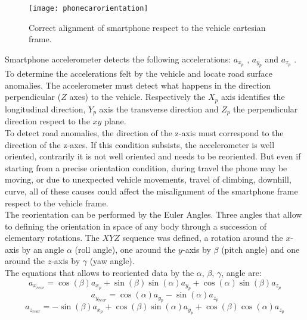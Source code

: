 \documentclass[tesi]{subfiles}
\begin{document}
\begin{figure}[H]
  \centering
  \texttt{[image: phonecarorientation]}  
  \caption{Correct alignment of smartphone respect to the vehicle cartesian frame.}
  \label{fig:Smartphone cartesian frame alignment respect Car axis.}
\end{figure}
\noindent Smartphone accelerometer detects the following accelerations: $a_{x_{p}}$ , $a_{y_{p}}$ and $a_{z_{p}}$ . To determine the accelerations felt by the vehicle and locate road surface anomalies. The accelerometer must detect what happens in the direction perpendicular ($Z$ axes) to the vehicle\cite{mohan2008nericell}.
Respectively the $X_{p}$ axis identifies the longitudinal direction, $Y_{p}$ axis the transverse direction and $Z_{p}$ the perpendicular direction respect to the $xy$ plane.\\

\noindent To detect road anomalies, the direction of the z-axis must correspond to the direction of the z-axes. If this condition subsists, the accelerometer is well oriented, contrarily it is not well oriented and needs to be reoriented. But even if starting from a precise orientation condition, during travel the phone may be moving, or due to unexpected vehicle movements, travel of climbing, downhill, curve, all of these causes could affect the misalignment of the smartphone frame respect to the vehicle frame.\\

\noindent The reorientation can be performed by the Euler Angles. Three angles that allow to defining the orientation in space of any body through a succession of elementary rotations\cite{diebel2006representing}.
The $XYZ$ sequence was defined, a rotation around the $x$-axis by an angle $\alpha$ (roll angle), one around the $y$-axis by $\beta$ (pitch angle) and one around the $z$-axis by  $\gamma$ (yaw angle).\\
\noindent The equations that allows to reoriented data by the $\alpha$, $\beta$, $\gamma$, angle are:\cite{Andro}
\begin{equation}
a_{x_{reor}} = \cos (\beta) a_{x_{p}} + \sin (\beta) \sin (\alpha) a_{y_{p}} + \cos (\alpha) \sin (\beta) a_{z_{p}} 
\end{equation}
\begin{equation}
a_{y_{reor}} = \cos (\alpha) a_{y_{p}} - \sin (\alpha) a_{z_{p}}
\end{equation}
\begin{equation}
a_{z_{reor}} = -\sin (\beta) a_{x_{p}} + \cos (\beta) \sin (\alpha) a_{y_{p}} + \cos (\beta) \cos (\alpha) a_{z_{p}}
\end{equation}
\end{document}
